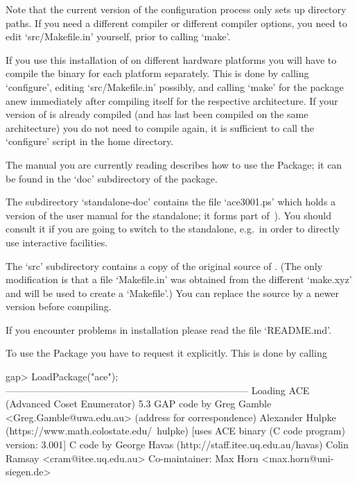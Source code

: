 Note that the  current version of the configuration  process only sets
up  directory paths.  If you  need a  different compiler  or different
compiler options, you need to edit `src/Makefile.in'  yourself,  prior
to calling `make'.

If you use this installation of {\GAP} on different hardware platforms
you will have to compile the binary for each platform separately. This
is done by calling `configure',  editing  `src/Makefile.in'  possibly,
and calling `make' for the package anew  immediately  after  compiling
{\GAP} itself for the respective  architecture.  If  your  version  of
{\GAP} is already compiled (and has last been  compiled  on  the  same
architecture)  you  do  not  need  to  compile  {\GAP}  again,  it  is
sufficient  to  call  the  `configure'  script  in  the  {\GAP}   home
directory.

The manual you are currently reading describes how to use  the  {\ACE}
Package; it can be found in the `doc' subdirectory of the package. %
%
%

The subdirectory `standalone-doc' contains the file `ace3001.ps' which
holds a version of the user manual for the {\ACE} standalone; it forms
part of~\cite{Ram99ace}). You should consult  it  if  you  are  going  to
switch to  the  {\ACE}  standalone,  e.g.~in  order  to  directly  use
interactive facilities.

The  `src' subdirectory  contains a  copy  of the  original source  of
{\ACE}.  (The  only modification  is  that  a  file `Makefile.in'  was
obtained from  the different `make.xyz' and  will be used  to create a
`Makefile'.)  You  can replace  the source by  a newer  version before
compiling.

If you encounter problems in installation please read the file `README.md'.


To use the {\ACE} Package you have  to  request  it  explicitly.
This is done by calling

\beginexample
gap> LoadPackage("ace");
---------------------------------------------------------------------------
Loading    ACE (Advanced Coset Enumerator) 5.3
GAP code by Greg Gamble <Greg.Gamble@uwa.edu.au> (address for correspondence)
       Alexander Hulpke (https://www.math.colostate.edu/~hulpke)
           [uses ACE binary (C code program) version: 3.001]
C code by  George Havas (http://staff.itee.uq.edu.au/havas)
           Colin Ramsay <cram@itee.uq.edu.au>
Co-maintainer: Max Horn <max.horn@uni-siegen.de>

